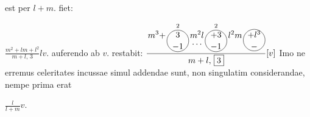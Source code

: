 est per $\displaystyle l + m$. fiet: \rule[-4mm]{0mm}{10mm}$\displaystyle \frac{m^2 + lm + l^2}{m + l, \, \boxed{3}} lv$.\protect\renewcommand{\arraystretch}{1.2} auferendo ab $\displaystyle v$. restabit:
$\displaystyle \frac{{\displaystyle{m^3} + \atop} \overset{2}{\raisebox{-4.5mm}{{\def\firstcircle{(0,0) circle (0.45cm)}\begin{tikzpicture}\draw \firstcircle node {$\displaystyle {3 \atop -1}$};\end{tikzpicture}}}} {\displaystyle{m^2l} \atop \displaystyle{\dots}} \overset{2}{\raisebox{-4.5mm}{{\def\firstcircle{(0,0) circle (0.45cm)}\begin{tikzpicture}\draw \firstcircle node {$\displaystyle {+3 \atop -1}$};\end{tikzpicture}}}} {\displaystyle{l^2m} \atop} \raisebox{-4.5mm}{{\def\firstcircle{(0,0) circle (0.45cm)}\begin{tikzpicture}\draw \firstcircle node {$\displaystyle {+l^3 \atop -}$};\end{tikzpicture}}}}{m + l, \, \boxed{3}} [v]$
%
Imo ne erremus celeritates\protect{} incussae simul addendae sunt, non singulatim 
considerandae, nempe prima erat \rule[-4mm]{0mm}{10mm}$\displaystyle \frac{l}{l + m} v$.
